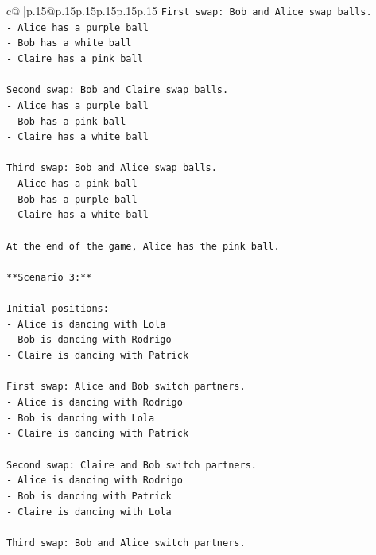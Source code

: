 \documentclass{article}
\begin{document}
{\begin{supertabular}{c@{$\;$}|p{.15\linewidth}@{}p{.15\linewidth}p{.15\linewidth}p{.15\linewidth}p{.15\linewidth}p{.15\linewidth}}
{{{\texttt{First swap: Bob and Alice swap balls.} \\
\texttt{{-} Alice has a purple ball} \\
\texttt{{-} Bob has a white ball} \\
\texttt{{-} Claire has a pink ball} \\
\\ 
\texttt{Second swap: Bob and Claire swap balls.} \\
\texttt{{-} Alice has a purple ball} \\
\texttt{{-} Bob has a pink ball} \\
\texttt{{-} Claire has a white ball} \\
\\ 
\texttt{Third swap: Bob and Alice swap balls.} \\
\texttt{{-} Alice has a pink ball} \\
\texttt{{-} Bob has a purple ball} \\
\texttt{{-} Claire has a white ball} \\
\\ 
\texttt{At the end of the game, Alice has the pink ball.} \\
\\ 
\texttt{**Scenario 3:**} \\
\\ 
\texttt{Initial positions:} \\
\texttt{{-} Alice is dancing with Lola} \\
\texttt{{-} Bob is dancing with Rodrigo} \\
\texttt{{-} Claire is dancing with Patrick} \\
\\ 
\texttt{First swap: Alice and Bob switch partners.} \\
\texttt{{-} Alice is dancing with Rodrigo} \\
\texttt{{-} Bob is dancing with Lola} \\
\texttt{{-} Claire is dancing with Patrick} \\
\\ 
\texttt{Second swap: Claire and Bob switch partners.} \\
\texttt{{-} Alice is dancing with Rodrigo} \\
\texttt{{-} Bob is dancing with Patrick} \\
\texttt{{-} Claire is dancing with Lola} \\
\\ 
\texttt{Third swap: Bob and Alice switch partners.} \\
}}}
\end{supertabular}}
\end{document}
